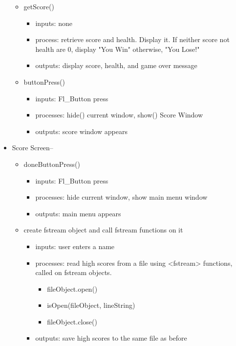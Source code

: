 \documentclass{article}
\begin{document}
\begin{itemize}
\begin{itemize}
\item getScore()
\begin{itemize}
\item inputs: none
\item process: retrieve score and health. Display it. If neither score not health are 0, display "You Win" otherwise, "You Lose!"
\item outputs: display score, health, and game over message
\end{itemize}
\item buttonPress()
\begin{itemize}
\item inputs: Fl\_Button press
\item processes: hide() current window, show() Score Window
\item outputs: score window appears
\end{itemize}
\end{itemize}
\item Score Screen--
\begin{itemize}
\item doneButtonPress()
\begin{itemize}
\item inputs: Fl\_Button press
\item processes: hide current window, show main menu window
\item outputs: main menu appears
\end{itemize}
\item create fstream object and call fstream functions on it
\begin{itemize}
\item inputs: user enters a name
\item processes: read high scores from a file using <fstream> functions, called on fstream objects.
\begin{itemize}
\item fileObject.open()
\item isOpen(fileObject, lineString)
\item fileObject.close()
\end{itemize}
\item outputs: save high scores to the same file as before
\end{itemize}
\end{itemize}
\end{itemize}
\end{document}
